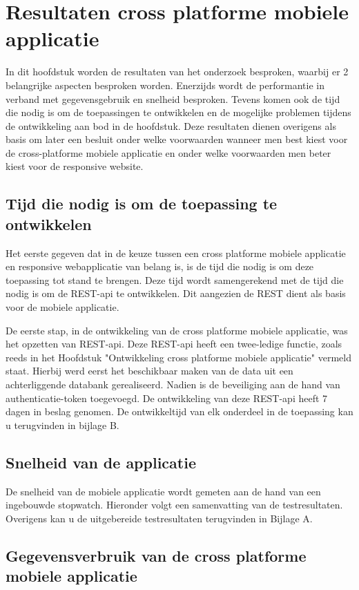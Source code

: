 \chapter{Resultaten cross platforme mobiele applicatie}
\label{ch:resultatencrossplatformapp}
In dit hoofdstuk worden de resultaten van het onderzoek besproken, waarbij er 2 belangrijke
aspecten besproken worden.
Enerzijds wordt de performantie in verband met gegevensgebruik en  snelheid besproken.
Tevens komen ook de tijd die nodig is om de toepassingen te ontwikkelen en de mogelijke
problemen tijdens de ontwikkeling aan bod in de hoofdstuk.
Deze resultaten dienen overigens als basis om later een besluit onder welke
voorwaarden wanneer men best kiest voor de
cross-platforme mobiele applicatie en onder welke voorwaarden men beter kiest voor de responsive website.

\section{Tijd die nodig is om de toepassing te ontwikkelen}
Het eerste gegeven dat in de keuze tussen een cross platforme mobiele
applicatie en responsive webapplicatie van belang is,
is de tijd die nodig is om deze toepassing tot stand te brengen.
Deze tijd wordt samengerekend met de tijd die nodig is om de
REST-api te ontwikkelen. Dit aangezien de REST dient als basis voor de mobiele applicatie.

De eerste stap, in de ontwikkeling van de cross platforme mobiele applicatie, was het opzetten van REST-api.
Deze REST-api heeft een twee-ledige functie, zoals reeds in het Hoofdstuk "Ontwikkeling cross platforme mobiele applicatie" vermeld staat.
Hierbij werd eerst het beschikbaar maken van de data uit een achterliggende databank gerealiseerd. Nadien is de beveiliging aan de hand
van authenticatie-token toegevoegd. De ontwikkeling van deze REST-api heeft 7 dagen in beslag genomen. De ontwikkeltijd van elk onderdeel
in de toepassing kan u terugvinden in bijlage B.

\section{Snelheid van de applicatie}
De snelheid van de mobiele applicatie wordt gemeten aan de hand van een ingebouwde stopwatch.
Hieronder volgt een samenvatting van de testresultaten. Overigens kan u de uitgebereide testresultaten terugvinden in Bijlage A.


\section{Gegevensverbruik van de cross platforme mobiele applicatie}

